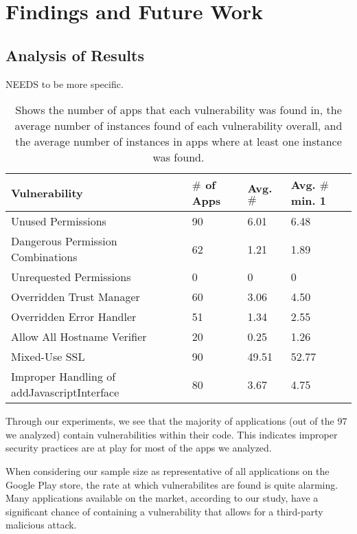 \section{Findings and Future Work}
\label{sec:relwork}

\subsection{Analysis of Results}

NEEDS to be more specific.\\
\begin{table}[!h]
    \centering
    \begin{tabular}{| m{4cm} | m{0.75cm}| m{0.75cm} | m{0.75cm} |} \hline
        Vulnerability & $\#$ of Apps & Avg. $\#$ & Avg. $\#$ min. 1\\ \hline
        Unused Permissions & 90 & 6.01 & 6.48\\ \hline
        Dangerous Permission Combinations & 62 & 1.21 & 1.89\\ \hline            
        Unrequested Permissions & 0 & 0 & 0\\ \hline
        Overridden Trust Manager & 60 & 3.06 & 4.50\\ \hline
        Overridden Error Handler & 51  & 1.34 & 2.55\\ \hline
        Allow All Hostname Verifier & 20 & 0.25 & 1.26\\ \hline
        Mixed-Use SSL& 90 & 49.51 & 52.77 \\ \hline
        Improper Handling of addJavascriptInterface & 80 & 3.67 & 4.75 \\ \hline
    \end{tabular}
    \caption{Shows the number of apps that each vulnerability was found in, the average number of instances found of each vulnerability overall, and the average number of instances in apps where at least one instance was found.}
    \label{tab:my_label}
\end{table}

Through our experiments, we see that the majority of applications
(out of the 97 we analyzed) contain vulnerabilities within their
code. This indicates improper security practices are at play for 
most of the apps we analyzed.

When considering our sample size as representative of all 
applications on the Google Play store, the rate at which 
vulnerabilites are found is quite alarming. Many applications
available on the market, according to our study, have a significant 
chance of containing a vulnerability that allows for a third-party 
malicious attack.


